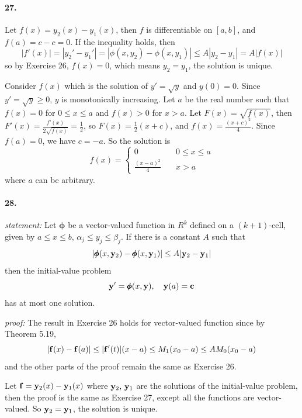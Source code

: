 \documentclass[a4paper]{article}
\begin{document}
\paragraph{27.}
Let $f(x)=y_2(x)-y_1(x)$, then $f$ is differentiable on $[a,b]$, and $f(a)=c-c=0$. If the inequality holds, then
\[
|f'(x)|=|y_2'-y_1'|=|\phi(x,y_2)-\phi(x,y_1)|\leq A|y_2-y_1|=A|f(x)|
\]
so by Exercise 26,\; $f(x)=0$, which means $y_2=y_1$, the solution is unique.

Consider $f(x)$ which is the solution of $y'=\sqrt{y}$ and $y(0)=0$. Since $y'=\sqrt{y}\geq0$, $y$ is monotonically increasing. Let $a$ be the real number such that $f(x)=0$ for $0\leq x\leq a$ and $f(x)>0$ for $x>a$. Let $F(x)=\sqrt{f(x)}$, then $F'(x)=\frac{f'(x)}{2\sqrt{f(x)}}=\frac{1}{2}$, so $F(x)=\frac{1}{2}(x+c)$, and $f(x)=\frac{(x+c)^2}{4}$. Since $f(a)=0$, we have $c=-a$. So the solution is 
\[
f(x)=\begin{cases}
0\quad & 0\leq x\leq a\\
\frac{(x-a)^2}{4}\quad & x>a
\end{cases}
\]
where $a$ can be arbitrary.

\paragraph{28.}
\textit{statement:}
Let $\pmb{\phi}$ be a vector-valued function in $R^k$ defined on a $(k+1)$-cell, given by $a\leq x\leq b$,\; $\alpha_j\leq y_j\leq \beta_j$. If there is a constant $A$ such that
\[
|\pmb\phi(x,\mathbf{y}_2)-\pmb\phi(x,\mathbf{y}_1) |\leq A|\mathbf{y}_2-\mathbf{y}_1|
\]
then the initial-value problem
\[
\mathbf{y}'=\pmb{\phi}(x,\mathbf{y}),\quad \mathbf{y}(a)=\mathbf{c}
\]
has at most one solution.
\medskip

\textit{proof:}
The result in Exercise 26 holds for vector-valued function since by Theorem 5.19,
\[
|\mathbf{f}(x)-\mathbf{f}(a)|\leq|\mathbf{f}'(t)|(x-a)\leq M_1(x_0-a)\leq AM_0(x_0-a)
\]
and the other parts of the proof remain the same as Exercise 26.

Let $\mathbf{f}=\mathbf{y}_2(x)-\mathbf{y}_1(x)$ where $\mathbf{y}_2,\,\mathbf{y}_1$ are the solutions of the initial-value problem, then the proof is the same as Exercise 27, except all the functions are vector-valued. So $\mathbf{y}_2=\mathbf{y}_1$, the solution is unique.
\end{document}
